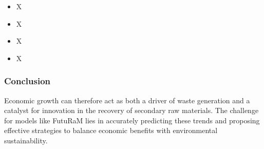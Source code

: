 \wasteSubsubsubsecELV
\begin{itemize}
    \item X
\end{itemize}

\wasteSubsubsubsecMIN
\begin{itemize}
    \item X
\end{itemize}

\wasteSubsubsubsecSLASH
\begin{itemize}
    \item X
\end{itemize}

\wasteSubsubsubsecWEEE
\begin{itemize}
    \item X
\end{itemize}



\subsubsection{Conclusion}

Economic growth can therefore act as both a driver of waste generation and a catalyst for innovation in the recovery of secondary raw materials. The challenge for models like FutuRaM lies in accurately predicting these trends and proposing effective strategies to balance economic benefits with environmental sustainability.


\sectionEndlines

\clearpage

